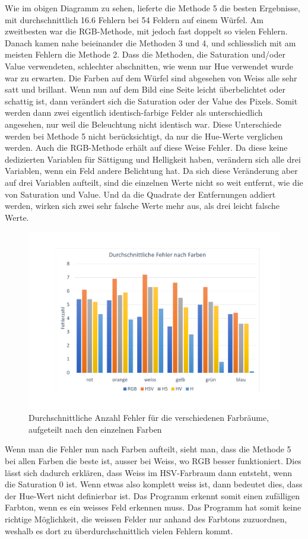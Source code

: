 \documentclass[a4paper, 12pt]{article}
\begin{document}
Wie im obigen Diagramm zu sehen, lieferte die Methode 5 die besten Ergebnisse, mit durchschnittlich 16.6 Fehlern bei 54 Feldern auf einem Würfel. Am zweitbesten war die RGB-Methode, mit jedoch fast doppelt so vielen Fehlern. Danach kamen nahe beieinander die Methoden 3 und 4, und schliesslich mit am meisten Fehlern die Methode 2. Dass die Methoden, die Saturation und/oder Value verwendeten, schlechter abschnitten, wie wenn nur Hue verwendet wurde war zu erwarten. Die Farben auf dem Würfel sind abgesehen von Weiss alle sehr satt und brillant. Wenn nun auf dem Bild eine Seite leicht überbelichtet oder schattig ist, dann verändert sich die Saturation oder der Value des Pixels. Somit werden dann zwei eigentlich identisch-farbige Felder als unterschiedlich angesehen, nur weil die Beleuchtung nicht identisch war. Diese Unterschiede werden bei Methode 5 nicht berücksichtigt, da nur die Hue-Werte verglichen werden. Auch die RGB-Methode erhält auf diese Weise Fehler. Da diese keine dedizierten Variablen für Sättigung und Helligkeit haben, verändern sich alle drei Variablen, wenn ein Feld andere Belichtung hat. Da sich diese Veränderung aber auf drei Variablen aufteilt, sind die einzelnen Werte nicht so weit entfernt, wie die von Saturation und Value. Und da die Quadrate der Entfernungen addiert werden, wirken sich zwei sehr falsche Werte mehr aus, als drei leicht falsche Werte. 
\begin{figure}[H]
\includegraphics[scale=0.4]{durchschnittliche_Fehler_nach_Farben}
\caption{Durchschnittliche Anzahl Fehler für die verschiedenen Farbräume, aufgeteilt nach den einzelnen Farben}
\end{figure}
Wenn man die Fehler nun nach Farben aufteilt, sieht man, dass die Methode 5 bei allen Farben die beste ist, ausser bei Weiss, wo RGB besser funktioniert. Dies lässt sich dadurch erklären, dass Weiss im HSV-Farbraum dann entsteht, wenn die Saturation 0 ist. Wenn etwas also komplett weiss ist, dann bedeutet dies, dass der Hue-Wert nicht definierbar ist. Das Programm erkennt somit einen zufälligen Farbton, wenn es ein weisses Feld erkennen muss. Das Programm hat somit keine richtige Möglichkeit, die weissen Felder nur anhand des Farbtons zuzuordnen, weshalb es dort zu überdurchschnittlich vielen Fehlern kommt. 
\end{document}
